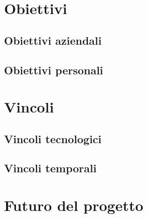 \section{Obiettivi}
\subsection{Obiettivi aziendali}
\subsection{Obiettivi personali}

\section{Vincoli}
\subsection{Vincoli tecnologici}
\subsection{Vincoli temporali}

\section{Futuro del progetto}
